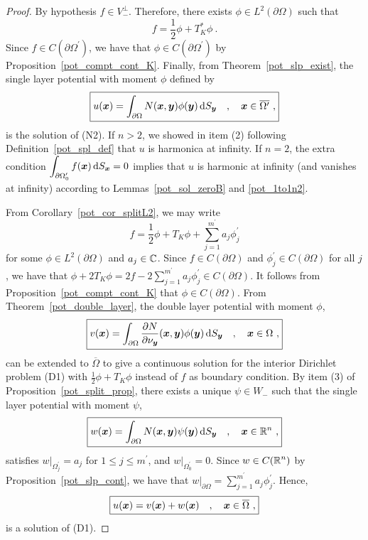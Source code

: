 \begin{proof}
By hypothesis $\displaystyle f \in V_-^\perp$.  Therefore, there exists
$\displaystyle \phi \in L^2(\partial \Omega)$ such that
\[
\boxed{
f = \frac{1}{2}\phi +T^\ast_K \phi \ .
}
\]
Since $\displaystyle f\in C(\partial \Omega^{\prime})$, we have that
$\displaystyle \phi \in C(\partial \Omega^{\prime})$ by
Proposition~\ref{pot_compt_cont_K}.
Finally, from Theorem~\ref{pot_slp_exist}, the single layer potential 
with moment $\phi$ defined by
\[
\boxed{
u({\bm{x}}) = \int_{\partial \Omega} N({\bm{x}},{\bm{y}})
\phi({\bm{y}}) \,\mathrm{d}{S}_{{\bm{y}}} \quad , \quad {\bm{x}} \in \overline{\Omega^{\prime}}
\ ,
}
\]
is the solution of (N2).  If $n>2$, we showed in item (2) following
Definition~\ref{pot_spl_def} that $u$ is harmonica at infinity.  If
$n=2$, the extra condition
$\displaystyle \int_{\partial \Omega_0^{\prime}} f({\bm{x}})\,\mathrm{d}{S}_{{\bm{x}}} = 0$ 
implies that $u$ is harmonic at infinity (and vanishes at infinity)
according to Lemmas~\ref{pot_sol_zeroB} and \ref{pot_1to1n2}.

 From Corollary~\ref{pot_cor_splitL2}, we may write
\[
\boxed{
f = \frac{1}{2} \phi + T_K \phi + \sum_{j=1}^{m^{\prime}} a_j \phi_j^{\prime}
}
\]
for some $\displaystyle \phi \in L^2(\partial \Omega)$ and $a_j \in \mathbb{C}$.
Since $f\in C(\partial \Omega)$ and
$\displaystyle \phi_j^{\prime} \in C(\partial \Omega)$
for all $j$, we have that
$\displaystyle
\phi + 2T_K \phi = 2f - 2 \sum_{j=1}^{m^{\prime}} a_j \phi_j^{\prime}
\in C(\partial \Omega)$.
It follows from Proposition~\ref{pot_compt_cont_K} that
$\phi \in C(\partial \Omega)$.  From Theorem~\ref{pot_double_layer},
the double layer potential with moment $\phi$,
\[
\boxed{
v({\bm{x}}) = \int_{\partial \Omega}
\frac{\partial{N}}{\partial \nu_{{\bm{y}}}}({\bm{x}},{\bm{y}}) \phi({\bm{y}})
\,\mathrm{d}{S}_{{\bm{y}}} \quad , \quad {\bm{x}} \in \Omega \ ,
}
\]
can be extended to $\overline{\Omega}$ to give a continuous solution for the
interior Dirichlet problem (D1) with 
$\displaystyle \frac{1}{2} \phi + T_K \phi$ instead of $f$ as boundary
condition.
By item (3) of Proposition~\ref{pot_split_prop}, there
exists a unique $\psi \in W_-$ such that the single layer potential
with moment $\psi$,
\[
\boxed{
w({\bm{x}}) = \int_{\partial \Omega} N({\bm{x}},{\bm{y}})
\psi({\bm{y}}) \,\mathrm{d}{S}_{{\bm{y}}} \quad , \quad {\bm{x}} \in \mathbb{R}^n \ ,
}
\]
satisfies $\displaystyle w\big|_{\Omega_j^{\prime}} = a_j$ for
$\displaystyle 1\leq j \leq m^{\prime}$, and
$\displaystyle w\big|_{\Omega_0^{\prime}} = 0$.
Since $\displaystyle w \in C(\mathbb{R}^n)$ by
Proposition~\ref{pot_slp_cont}, we have that
$\displaystyle 
w\big|_{\partial \Omega} = \sum_{j=1}^{m^{\prime}} a_j \phi_j^{\prime}$.
Hence,
\[
\boxed{
u({\bm{x}}) = v({\bm{x}}) + w({\bm{x}}) \quad , \quad {\bm{x}} \in
\overline{\Omega} \ ,
}
\]
is a solution of (D1).


\end{proof}
